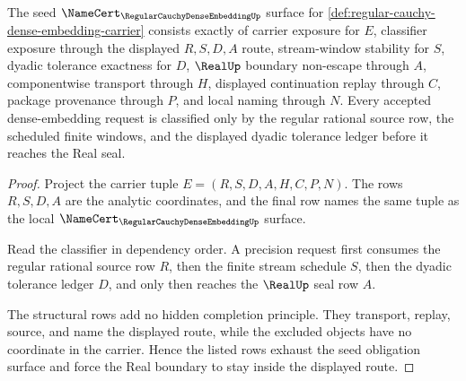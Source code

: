 \begin{theorem}
\label{thm:regular-cauchy-dense-embedding-namecert-obligations}
The seed $\NameCert_{\RegularCauchyDenseEmbeddingUp}$ surface for \autoref{def:regular-cauchy-dense-embedding-carrier} consists exactly of carrier exposure for $E$, classifier exposure through the displayed $R,S,D,A$ route, stream-window stability for $S$, dyadic tolerance exactness for $D$, $\RealUp$ boundary non-escape through $A$, componentwise transport through $H$, displayed continuation replay through $C$, package provenance through $P$, and local naming through $N$. Every accepted dense-embedding request is classified only by the regular rational source row, the scheduled finite windows, and the displayed dyadic tolerance ledger before it reaches the Real seal.
\end{theorem}
\begin{proof}
Project the carrier tuple $E=(R,S,D,A,H,C,P,N)$. The rows $R,S,D,A$ are the analytic coordinates, and the final row names the same tuple as the local $\NameCert_{\RegularCauchyDenseEmbeddingUp}$ surface.

Read the classifier in dependency order. A precision request first consumes the regular rational source row $R$, then the finite stream schedule $S$, then the dyadic tolerance ledger $D$, and only then reaches the $\RealUp$ seal row $A$.

The structural rows add no hidden completion principle. They transport, replay, source, and name the displayed route, while the excluded objects have no coordinate in the carrier. Hence the listed rows exhaust the seed obligation surface and force the Real boundary to stay inside the displayed route.
\end{proof}

